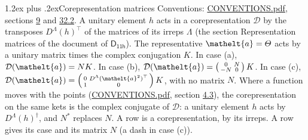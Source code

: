 \documentclass[10pt,a4paper]{article}
\makeatletter
\renewcommand\section{\@startsection{section}{1}{\z@}{-3ex plus -1ex minus -.2ex}%
  {1.2ex plus .2ex}{\normalfont\large\sffamily\bfseries\color{parttitle}}}
\numberwithin{equation}{section}
\newcommand{\eltfont}[1]{{\let\sigma\eltsigma\mathelt{#1}}}
\newcommand{\grp}[1]{\mathsf{#1}}
\newcommand{\elt}[1]{\eltfont{#1}}
\makeatother
\begin{document}
\section{Corepresentation matrices}\label{s:corep_matrices}
Conventions: \href{../../CONVENTIONS.pdf}{CONVENTIONS.pdf}, sections \href{../../../rotation/CONVENTIONS.pdf\#conv.9}{9} and \href{../../CONVENTIONS.pdf\#conv.32.2}{32.2}.
A unitary element $h$ acts in a corepresentation $\mathcal{D}$ by the transposes $D^{\Lambda}(h)^{\top}$ of the matrices of its irreps $\Lambda$ (the section Representation matrices of the document of \href{../../../rotation/data/pdf/D11h.pdf}{$\grp{D_{11h}}$}). The representative $\elt{a} = \varTheta$ acts by a unitary matrix times the complex conjugation $K$.
In case (a), $\mathcal{D}(\elt{a}) = NK$. In case (b), $\mathcal{D}(\elt{a}) = \left(\begin{smallmatrix} 0 & N \\ -N & 0 \end{smallmatrix}\right) K$. In case (c), $\mathcal{D}(\elt{a}) = \left(\begin{smallmatrix} 0 & D^{\Lambda}(\elt{a}^2)^{\top} \\ 1 & 0 \end{smallmatrix}\right) K$, with no matrix $N$.
Where a function moves with the points (\href{../../CONVENTIONS.pdf}{CONVENTIONS.pdf}, section \href{../../../rotation/CONVENTIONS.pdf\#conv.4.3}{4.3}), the corepresentation on the same kets is the complex conjugate of $\mathcal{D}$: a unitary element $h$ acts by $D^{\Lambda}(h)^{\dagger}$, and $N^{*}$ replaces $N$.
A row is a corepresentation, by its irreps. A row gives its case and its matrix $N$ (a dash in case (c)).
\end{document}
